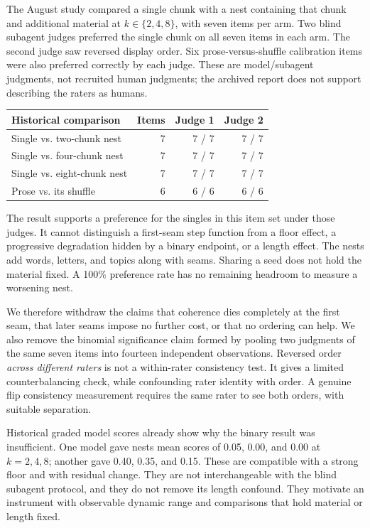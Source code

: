 \documentclass[11pt,letterpaper]{article}
\newcommand{\pageend}{\clearpage}
\begin{document}
The August study compared a single chunk with a nest containing that chunk and additional material at $k\in\{2,4,8\}$, with seven items per arm. Two blind subagent judges preferred the single chunk on all seven items in each arm. The second judge saw reversed display order. Six prose-versus-shuffle calibration items were also preferred correctly by each judge. These are model/subagent judgments, not recruited human judgments; the archived report does not support describing the raters as humans.

\begin{center}\small
\begin{tabular}{lrrr}\toprule
Historical comparison & Items & Judge 1 & Judge 2\\\midrule
Single vs. two-chunk nest & 7 & 7 / 7 & 7 / 7\\
Single vs. four-chunk nest & 7 & 7 / 7 & 7 / 7\\
Single vs. eight-chunk nest & 7 & 7 / 7 & 7 / 7\\
Prose vs. its shuffle & 6 & 6 / 6 & 6 / 6\\\bottomrule
\end{tabular}
\end{center}

The result supports a preference for the singles in this item set under those judges. It cannot distinguish a first-seam step function from a floor effect, a progressive degradation hidden by a binary endpoint, or a length effect. The nests add words, letters, and topics along with seams. Sharing a seed does not hold the material fixed. A 100\% preference rate has no remaining headroom to measure a worsening nest.

We therefore withdraw the claims that coherence dies completely at the first seam, that later seams impose no further cost, or that no ordering can help. We also remove the binomial significance claim formed by pooling two judgments of the same seven items into fourteen independent observations. Reversed order \emph{across different raters} is not a within-rater consistency test. It gives a limited counterbalancing check, while confounding rater identity with order. A genuine flip consistency measurement requires the same rater to see both orders, with suitable separation.

Historical graded model scores already show why the binary result was insufficient. One model gave nests mean scores of 0.05, 0.00, and 0.00 at $k=2,4,8$; another gave 0.40, 0.35, and 0.15. These are compatible with a strong floor and with residual change. They are not interchangeable with the blind subagent protocol, and they do not remove its length confound. They motivate an instrument with observable dynamic range and comparisons that hold material or length fixed.
\pageend
\end{document}
